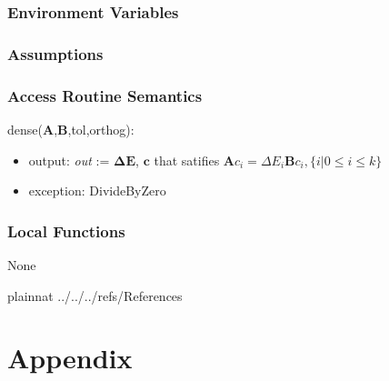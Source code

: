 \documentclass[12pt, titlepage]{article}
\begin{document}

\subsubsection{Environment Variables}


\subsubsection{Assumptions}


\subsubsection{Access Routine Semantics}

\noindent dense($\textbf{A}$,$\textbf{B}$,tol,orthog):
\begin{itemize}
	\item output: \textit{out} := $\boldsymbol{\Delta E}$, $\boldsymbol{c}$ 
	that satifies $\boldsymbol{A}c_i=\Delta E_i \boldsymbol{B} c_i, \{i|0\le i 
	\le k\} $
	\item exception: DivideByZero 
\end{itemize}

%

\subsubsection{Local Functions}

None

\newpage

 {plainnat}
 {../../../refs/References}

\newpage

\section{Appendix} \label{Appendix}

\end{document}
